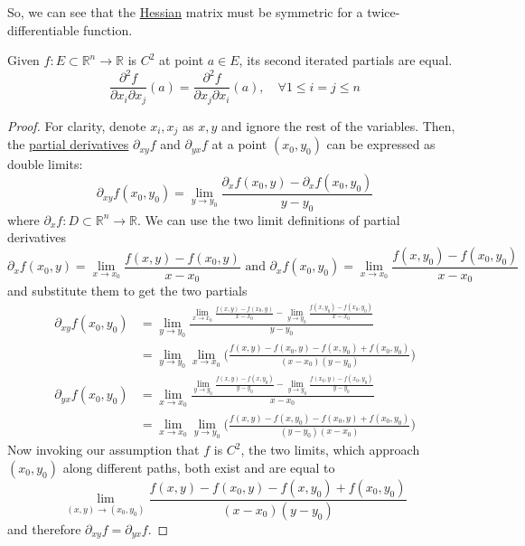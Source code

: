 	So, we can see that the \hyperref[def:hessian]{Hessian} matrix must be symmetric for a twice-differentiable function. 

  \begin{theorem}
    \label{thm:clairuts-theorem}
		Given $f: E \subset \mathbb{R}^n \to \mathbb{R}$ is $C^2$ at point $a \in E$, its second iterated partials are equal. 
    \begin{equation}
			\frac{\partial^2 f}{\partial x_i \partial x_j} (a) = \frac{\partial^2 f}{\partial x_j \partial x_i} (a), \quad \forall 1 \leq i = j \leq n
    \end{equation}
  \end{theorem}
  \begin{proof}
    For clarity, denote $x_i, x_j$ as $x, y$ and ignore the rest of the variables. Then, the \hyperref[def:partial-derivative]{partial derivatives} $\partial_{x y} f$ and $\partial_{y x} f$ at a point $(x_0, y_0)$ can be expressed as double limits: 
    \begin{equation}
      \partial_{x y} f (x_0, y_0) = \lim_{y \rightarrow y_0} \frac{\partial_x f (x_0, y) - \partial_x f (x_0, y_0)}{y - y_0}
    \end{equation}
    where $\partial_x f: D \subset \mathbb{R}^n \to \mathbb{R}$. We can use the two limit definitions of partial derivatives
    \begin{equation}
      \partial_x f (x_0, y) = \lim_{x \rightarrow x_0} \frac{f(x, y) - f(x_0, y)}{x-x_0} \text{ and } \partial_x f (x_0, y_0) = \lim_{x \rightarrow x_0} \frac{f(x, y_0) - f(x_0, y_0)}{x-x_0}
    \end{equation}
    and substitute them to get the two partials
    \begin{align}
      \partial_{xy} f (x_0, y_0) & = \lim_{y \rightarrow y_0} \frac{ \lim_{x \rightarrow x_0} \frac{f(x, y) - f(x_0, y)}{x-x_0} - \lim_{y \rightarrow y_0} \frac{f(x, y_0) - f(x_0, y_0)}{x-x_0}}{y - y_0} \\
      & =  \lim_{y \rightarrow y_0} \lim_{x \rightarrow x_0} \bigg( \frac{f(x, y) - f(x_0, y) - f(x, y_0) + f(x_0, y_0)}{(x - x_0) (y - y_0)} \bigg) \\
      \partial_{yx} f (x_0, y_0) & = \lim_{x \rightarrow x_0} \frac{ \lim_{y \rightarrow y_0} \frac{f(x, y) - f(x, y_0)}{y-y_0} - \lim_{y \rightarrow y_0} \frac{f(x_0, y) - f(x_0, y_0)}{y-y_0}}{x - x_0} \\
      & = \lim_{x \rightarrow x_0} \lim_{y \rightarrow y_0} \bigg( \frac{f(x, y) - f(x, y_0) - f(x_0, y) + f(x_0, y_0)}{(y-y_0) (x-x_0)} \bigg)
    \end{align}
    Now invoking our assumption that $f$ is $C^2$, the two limits, which approach $(x_0, y_0)$ along different paths, both exist and are equal to 
    \begin{equation}
      \lim_{(x, y) \rightarrow (x_0, y_0)} \frac{f(x, y) - f(x_0, y) - f(x, y_0) + f(x_0, y_0)}{(x - x_0) (y - y_0)}
    \end{equation}
    and therefore $\partial_{x y} f = \partial_{y x} f$. 
  \end{proof}

